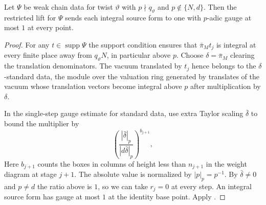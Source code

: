 \begin{lemma}
\label{lem:a-weak-chain-integral-away}
\emitthmsource
Let $\Psi$ be weak chain data for twist $\vartheta$ with $p\nmid q_\vartheta$ and $p\notin\{N,d\}$. Then the restricted lift for $\Psi$ sends each integral source form to one with $p$-adic gauge at most $1$ at every point.
\end{lemma}
\begin{proof}
For any $t\in\operatorname{supp}\Psi$ the support condition ensures that $\bar\pi_Mt_j$ is integral at every finite place away from $q_\vartheta N$, in particular above $p$. Choose $\delta=\bar\pi_M$ clearing the translation denominators. The vacuum translated by $t_j$ hence belongs to the $\delta$-standard data, the module over the valuation ring generated by translates of the vacuum whose translation vectors become integral above $p$ after multiplication by $\delta$.

In the single-step gauge estimate for standard data, use extra Taylor scaling $\bar\delta$ to bound the multiplier by
\[
  \left(\frac{|\bar\delta|_p}{|d\bar\delta|_p}\right)^{b_{j+1}},
\]
Here $b_{j+1}$ counts the boxes in columns of height less than $n_{j+1}$ in the weight diagram at stage $j+1$. The absolute value is normalized by $|p|_p=p^{-1}$. By $\bar\delta\ne0$ and $p\ne d$ the ratio above is $1$, so we can take $r_j=0$ at every step. An integral source form has gauge at most $1$ at the identity base point. Apply .
\end{proof}

